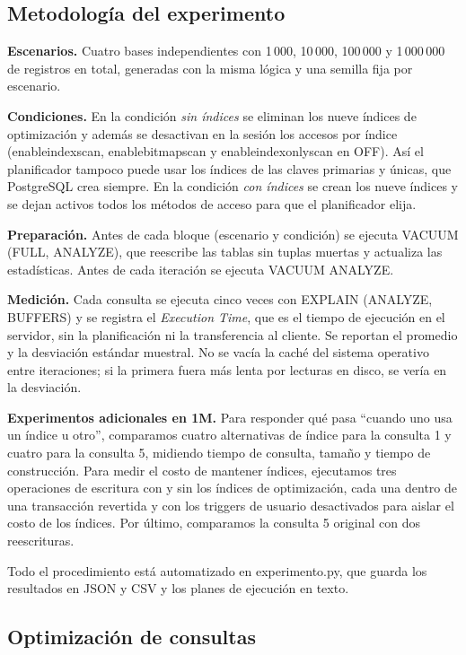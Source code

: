 \documentclass[11pt,letterpaper]{article}
\newcommand{\tbus}{\textunderscore\allowbreak}
\newcommand{\tb}[1]{{\ttfamily\let\_\tbus #1}}
\begin{document}
\subsection{Metodología del experimento}

\textbf{Escenarios.} Cuatro bases independientes con 1\,000, 10\,000, 100\,000 y 1\,000\,000 de registros en total, generadas con la misma lógica y una semilla fija por escenario.

\textbf{Condiciones.} En la condición \emph{sin índices} se eliminan los nueve índices de optimización y además se desactivan en la sesión los accesos por índice (\tb{enable\_indexscan}, \tb{enable\_bitmapscan} y \tb{enable\_indexonlyscan} en \tb{OFF}). Así el planificador tampoco puede usar los índices de las claves primarias y únicas, que PostgreSQL crea siempre. En la condición \emph{con índices} se crean los nueve índices y se dejan activos todos los métodos de acceso para que el planificador elija.

\textbf{Preparación.} Antes de cada bloque (escenario y condición) se ejecuta \tb{VACUUM (FULL, ANALYZE)}, que reescribe las tablas sin tuplas muertas y actualiza las estadísticas. Antes de cada iteración se ejecuta \tb{VACUUM ANALYZE}.

\textbf{Medición.} Cada consulta se ejecuta cinco veces con \tb{EXPLAIN (ANALYZE, BUFFERS)} y se registra el \emph{Execution Time}, que es el tiempo de ejecución en el servidor, sin la planificación ni la transferencia al cliente. Se reportan el promedio y la desviación estándar muestral. No se vacía la caché del sistema operativo entre iteraciones; si la primera fuera más lenta por lecturas en disco, se vería en la desviación.

\textbf{Experimentos adicionales en 1M.} Para responder qué pasa ``cuando uno usa un índice u otro'', comparamos cuatro alternativas de índice para la consulta 1 y cuatro para la consulta 5, midiendo tiempo de consulta, tamaño y tiempo de construcción. Para medir el costo de mantener índices, ejecutamos tres operaciones de escritura con y sin los índices de optimización, cada una dentro de una transacción revertida y con los triggers de usuario desactivados para aislar el costo de los índices. Por último, comparamos la consulta 5 original con dos reescrituras.

Todo el procedimiento está automatizado en \tb{experimento.py}, que guarda los resultados en JSON y CSV y los planes de ejecución en texto.

\subsection{Optimización de consultas}
\end{document}
